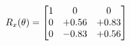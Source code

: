 \documentclass[preview]{standalone}
\begin{document}
\begin{align*}
\special{dvisvgm:raw <g id='unique000'>}R_{x}(\theta) = \begin{bmatrix}1 & 0 & 0 \\0 & +0.56 & +0.83 \\0 & -0.83 & +0.56\end{bmatrix}\special{dvisvgm:raw </g>}
\end{align*}
\end{document}
